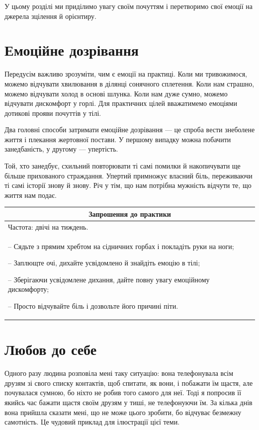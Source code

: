\documentclass[oneside, 12pt]{book}
\newenvironment{prat}[1]
{\begin{center}
\begin{tabular}{p{0.9\textwidth}}
\hline\hline
\multicolumn{1}{c}{Запрошення до практики}\\
\hline
Частота: #1.\\
\hline
}{\\
\hline\hline
\end{tabular} 
\end{center}}
\begin{document}
У цьому розділі ми приділимо увагу своїм почуттям і перетворимо свої емоції на джерела зцілення й орієнтиру.

\section*{Емоційне дозрівання}

Передусім важливо зрозуміти, чим є емоції на практиці. Коли ми тривожимося, можемо відчувати хвилювання в ділянці сонячного сплетення. Коли нам страшно, можемо відчувати холод в основі шлунка. Коли нам дуже сумно, можемо відчувати дискомфорт у горлі. Для практичних цілей вважатимемо емоціями дотикові прояви почуттів у тілі.

Два головні способи затримати емоційне дозрівання --- це спроба вести знеболене життя і плекання жертовної постави. У першому випадку можна побачити занедбаність, у другому --- упертість.

Той, хто занедбує, схильний повторювати ті самі помилки й накопичувати ще більше прихованого страждання. Упертий примножує власний біль, переживаючи ті самі історії знову й знову. Річ у тім, що нам потрібна мужність відчути те, що життя нам подає.

\begin{prat}{двічі на тиждень}
-- Сядьте з прямим хребтом на сідничних горбах і покладіть руки на ноги;

-- Заплющте очі, дихайте усвідомлено й знайдіть емоцію в тілі;

-- Зберігаючи усвідомлене дихання, дайте повну увагу емоційному дискомфорту;

-- Просто відчувайте біль і дозвольте його причині піти.
\end{prat}

\section*{Любов до себе}

Одного разу людина розповіла мені таку ситуацію: вона телефонувала всім друзям зі свого списку контактів, щоб спитати, як вони, і побажати їм щастя, але почувалася сумною, бо ніхто не робив того самого для неї. Тоді я попросив її якийсь час бажати щастя своїм друзям у тиші, не телефонуючи їм. За кілька днів вона прийшла сказати мені, що не може цього зробити, бо відчуває безмежну самотність. Це чудовий приклад для ілюстрації цієї теми.
\end{document}

